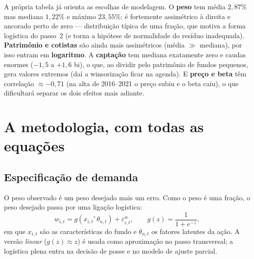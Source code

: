 \documentclass[11pt,a4paper]{article}
\begin{document}
\noindent A própria tabela já orienta as escolhas de modelagem. O \textbf{peso} tem média
$2{,}87\%$ mas mediana $1{,}22\%$ e máximo $23{,}55\%$: é fortemente assimétrico à direita e
ancorado perto de zero --- distribuição típica de uma fração, que motiva a forma logística do
passo~2 (e torna a hipótese de normalidade do resíduo inadequada). \textbf{Patrimônio e cotistas}
são ainda mais assimétricos (média $\gg$ mediana), por isso entram em \textbf{logaritmo}. A
\textbf{captação} tem mediana exatamente zero e caudas enormes ($-1{,}5$ a $+1{,}6$ bi), o que, ao
dividir pelo patrimônio de fundos pequenos, gera valores extremos (daí a winsorização ficar na
agenda). E \textbf{preço e beta} têm correlação $\approx-0{,}71$ (na alta de 2016--2021 o preço
subiu e o beta caiu), o que dificultará separar os dois efeitos mais adiante.

\section{A metodologia, com todas as equações}

\subsection{Especificação de demanda}
O peso observado é um peso desejado mais um erro. Como o peso é uma fração, o peso desejado passa
por uma ligação logística:
\begin{equation}
w_{i,t} = g\!\left(x_{i,t}'\,\theta_{n,t}\right) + \varepsilon^{w}_{i,t},
\qquad g(z)=\frac{1}{1+e^{-z}},
\label{eq:logit}
\end{equation}
em que $x_{i,t}$ são as características do fundo e $\theta_{n,t}$ os fatores latentes da ação.
A versão \emph{linear} ($g(z)\approx z$) é usada como aproximação no passo transversal; a
logística plena entra na decisão de posse e no modelo de ajuste parcial.
\end{document}
